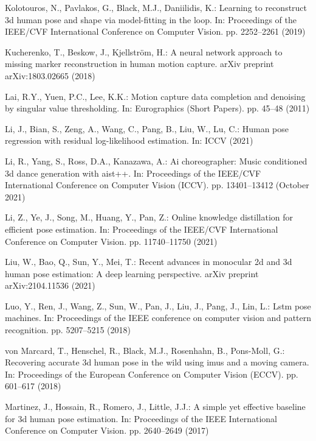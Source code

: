 \documentclass[runningheads]{llncs}
\begin{document}
\begin{thebibliography}{10}
Kolotouros, N., Pavlakos, G., Black, M.J., Daniilidis, K.: Learning to
  reconstruct 3d human pose and shape via model-fitting in the loop. In:
  Proceedings of the IEEE/CVF International Conference on Computer Vision. pp.
  2252--2261 (2019)

Kucherenko, T., Beskow, J., Kjellstr{\"o}m, H.: A neural network approach to
  missing marker reconstruction in human motion capture. arXiv preprint
  arXiv:1803.02665  (2018)

Lai, R.Y., Yuen, P.C., Lee, K.K.: Motion capture data completion and denoising
  by singular value thresholding. In: Eurographics (Short Papers). pp. 45--48
  (2011)

Li, J., Bian, S., Zeng, A., Wang, C., Pang, B., Liu, W., Lu, C.: Human pose
  regression with residual log-likelihood estimation. In: ICCV (2021)

Li, R., Yang, S., Ross, D.A., Kanazawa, A.: Ai choreographer: Music conditioned
  3d dance generation with aist++. In: Proceedings of the IEEE/CVF
  International Conference on Computer Vision (ICCV). pp. 13401--13412 (October
  2021)

Li, Z., Ye, J., Song, M., Huang, Y., Pan, Z.: Online knowledge distillation for
  efficient pose estimation. In: Proceedings of the IEEE/CVF International
  Conference on Computer Vision. pp. 11740--11750 (2021)

Liu, W., Bao, Q., Sun, Y., Mei, T.: Recent advances in monocular 2d and 3d
  human pose estimation: A deep learning perspective. arXiv preprint
  arXiv:2104.11536  (2021)

Luo, Y., Ren, J., Wang, Z., Sun, W., Pan, J., Liu, J., Pang, J., Lin, L.: Lstm
  pose machines. In: Proceedings of the IEEE conference on computer vision and
  pattern recognition. pp. 5207--5215 (2018)

von Marcard, T., Henschel, R., Black, M.J., Rosenhahn, B., Pons-Moll, G.:
  Recovering accurate 3d human pose in the wild using imus and a moving camera.
  In: Proceedings of the European Conference on Computer Vision (ECCV). pp.
  601--617 (2018)

Martinez, J., Hossain, R., Romero, J., Little, J.J.: A simple yet effective
  baseline for 3d human pose estimation. In: Proceedings of the IEEE
  International Conference on Computer Vision. pp. 2640--2649 (2017)


\end{thebibliography}
\end{document}
